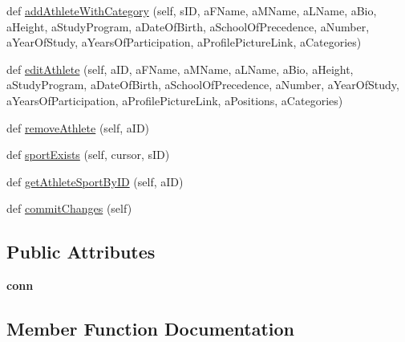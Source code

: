 \begin{DoxyCompactItemize}
\item 
def \hyperlink{classhandler_1_1dao_1_1athlete__dao_1_1_athlete_d_a_o_a733537eff0206d83f15436b09704be45}{add\+Athlete\+With\+Category} (self, s\+ID, a\+F\+Name, a\+M\+Name, a\+L\+Name, a\+Bio, a\+Height, a\+Study\+Program, a\+Date\+Of\+Birth, a\+School\+Of\+Precedence, a\+Number, a\+Year\+Of\+Study, a\+Years\+Of\+Participation, a\+Profile\+Picture\+Link, a\+Categories)
\item 
def \hyperlink{classhandler_1_1dao_1_1athlete__dao_1_1_athlete_d_a_o_a79d97bcfdc2ba5f68bfdf975f7c341b9}{edit\+Athlete} (self, a\+ID, a\+F\+Name, a\+M\+Name, a\+L\+Name, a\+Bio, a\+Height, a\+Study\+Program, a\+Date\+Of\+Birth, a\+School\+Of\+Precedence, a\+Number, a\+Year\+Of\+Study, a\+Years\+Of\+Participation, a\+Profile\+Picture\+Link, a\+Positions, a\+Categories)
\item 
def \hyperlink{classhandler_1_1dao_1_1athlete__dao_1_1_athlete_d_a_o_a2677d09a6586e6742190c81270dc408a}{remove\+Athlete} (self, a\+ID)
\item 
def \hyperlink{classhandler_1_1dao_1_1athlete__dao_1_1_athlete_d_a_o_acf5929b8fe16451d4dad25146d93e426}{sport\+Exists} (self, cursor, s\+ID)
\item 
def \hyperlink{classhandler_1_1dao_1_1athlete__dao_1_1_athlete_d_a_o_a95876679c31686ed6516687c82d3df6f}{get\+Athlete\+Sport\+By\+ID} (self, a\+ID)
\item 
def \hyperlink{classhandler_1_1dao_1_1athlete__dao_1_1_athlete_d_a_o_ace87d62a49dc3b03b88d6ff8cf6b0210}{commit\+Changes} (self)
\end{DoxyCompactItemize}
\subsection*{Public Attributes}
\begin{DoxyCompactItemize}
\item 
\mbox{\label{classhandler_1_1dao_1_1athlete__dao_1_1_athlete_d_a_o_af4e1dac056a1885b6b60eed1faea3b48}} 
{\bfseries conn}
\end{DoxyCompactItemize}


\subsection{Member Function Documentation}
\mbox{\label{classhandler_1_1dao_1_1athlete__dao_1_1_athlete_d_a_o_a8d63542ce2b12f1e736ad2dc718b07cd}} 
